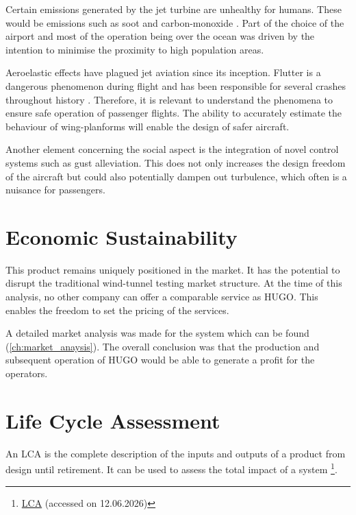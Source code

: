 Certain emissions generated by the jet turbine are unhealthy for humans. These would be emissions such as soot and carbon-monoxide \cite{masiol2014aircraft}. Part of the choice of the airport and most of the operation being over the ocean was driven by the intention to minimise the proximity to high population areas.

Aeroelastic effects have plagued jet aviation since its inception. Flutter is a dangerous phenomenon during flight and has been responsible for several crashes throughout history \cite{nasa2011modeling}. Therefore, it is relevant to understand the phenomena to ensure safe operation of passenger flights. The ability to accurately estimate the behaviour of wing-planforms will enable the design of safer aircraft.  

Another element concerning the social aspect is the integration of novel control systems such as gust alleviation. This does not only increases the design freedom of the aircraft but could also potentially dampen out turbulence, which often is a nuisance for passengers.   

\section{Economic Sustainability}
\label{sec:economic sustainability}


This product remains uniquely positioned in the market. It has the potential to disrupt the traditional wind-tunnel testing market structure. At the time of this analysis, no other company can offer a comparable service as HUGO. This enables the freedom to set the pricing of the services.   

A detailed market analysis was made for the system which can be found (\autoref{ch:market_anaysis}). The overall conclusion was that the production and subsequent operation of HUGO would be able to generate a profit for the operators.  

\section{Life Cycle Assessment}
\label{sec:LCA} 

An LCA is the complete description of the inputs and outputs of a product from design until retirement. It can be used to assess the total impact of a system \footnote{\href{https://ecochain.com/blog/life-cycle-assessment-lca-guide/}{LCA} (accessed on 12.06.2026)}.    

